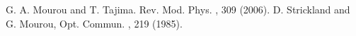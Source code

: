 
\begin{thebibliography}{99}
  G. A. Mourou and T. Tajima. Rev. Mod. Phys. , 309 (2006).
  D. Strickland and G. Mourou, Opt. Commun. , 219 (1985).
\end{thebibliography}